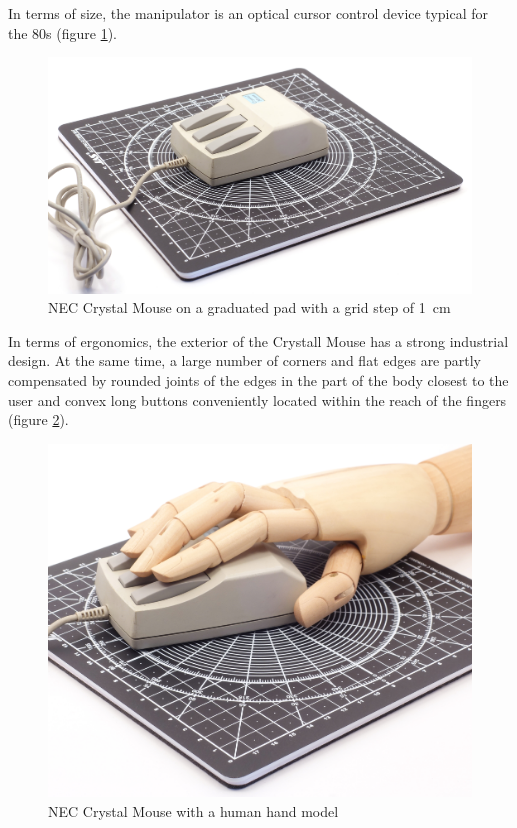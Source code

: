 \documentclass[11pt, a4paper]{article}
\begin{document}
In terms of size, the manipulator is an optical cursor control device typical for the 80s (figure \ref{fig:NecCrystalSize}).

\begin{figure}[h]
    \centering
    \includegraphics[scale=0.4]{1986_nec_crystal_mouse/NecKovrik_60.jpg}
    \caption{NEC Crystal Mouse on a graduated pad with a grid step of 1~cm}
    \label{fig:NecCrystalSize}
\end{figure}

In terms of ergonomics, the exterior of the Crystall Mouse has a strong industrial design. At the same time, a large number of corners and flat edges are partly compensated by rounded joints of the edges in the part of the body closest to the user and convex long buttons conveniently located within the reach of the fingers (figure \ref{fig:NecCrystalHand}).

\begin{figure}[h]
    \centering
    \includegraphics[scale=0.4]{1986_nec_crystal_mouse/NecRuka_30.jpg}
    \caption{NEC Crystal Mouse with a human hand model}
    \label{fig:NecCrystalHand}
\end{figure}
\end{document}
